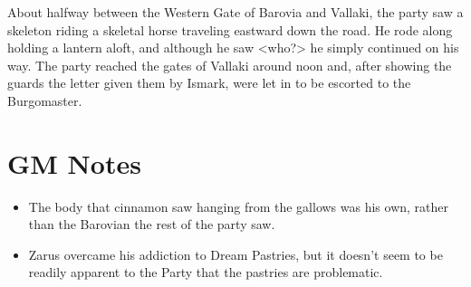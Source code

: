 \documentclass[a4paper,11pt]{article}
\begin{document}
About halfway between the Western Gate of Barovia and Vallaki, the party saw a skeleton riding a skeletal horse
traveling eastward down the road. He rode along holding a lantern aloft, and although he saw <who?> he simply
continued on his way. The party reached the gates of Vallaki around noon and, after showing the guards the letter
given them by Ismark, were let in to be escorted to the Burgomaster.

\section{GM Notes}
\begin{itemize}
  \item The body that cinnamon saw hanging from the gallows was his own, rather than the Barovian the rest of the 
  party saw.
  \item Zarus overcame his addiction to Dream Pastries, but it doesn't seem to be readily apparent to the Party
  that the pastries are problematic.
\end{itemize}
\end{document}
